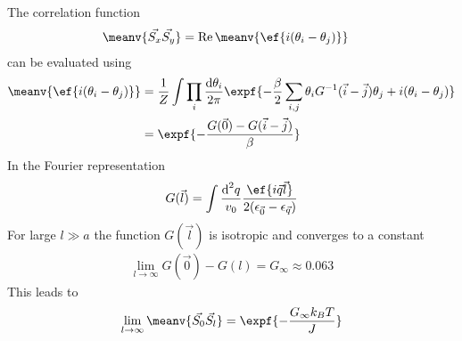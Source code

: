 The correlation function
\begin{align*}
\meanv{\vec{S_x} \vec{S_y}} &= \mathop{\text{Re}}\meanv{\ef{i(\theta_i-\theta_j)}}
\end{align*}
can be evaluated using
\begin{align*}
\meanv{\ef{i(\theta_i-\theta_j)}} &= \frac{1}{Z} \int\prod_{i} \frac{\text{d}\theta_i}{2\pi} \expf{-\frac{\beta}{2} \sum_{i, j} \theta_i G^{-1}(\vec{i}-\vec{j}) \theta_j + i (\theta_i-\theta_j)} \\
&= \expf{-\frac{G(\vec{0})-G(\vec{i}-\vec{j})}{\beta}}
\end{align*}
In the Fourier representation
\begin{align*}
G(\vec{l})=\int \frac{\text{d}^2q}{v_0} \frac{\ef{i\vec{q}\vec{l}}}{2(\epsilon_{\vec{0}} - \epsilon_{\vec{q}})}
\end{align*}
For large $l\gg a$ the function $G(\vec{l})$ is isotropic and converges to a constant
\begin{align*}
\lim_{l\rightarrow\infty} G(\vec{0})-G(l) = G_\infty \approx 0.063
\end{align*}
This leads to
\begin{align*}
\lim_{l\rightarrow\infty}\meanv{\vec{S_0} \vec{S_l}} = \expf{-\frac{G_\infty k_BT}{J}}
\end{align*}

